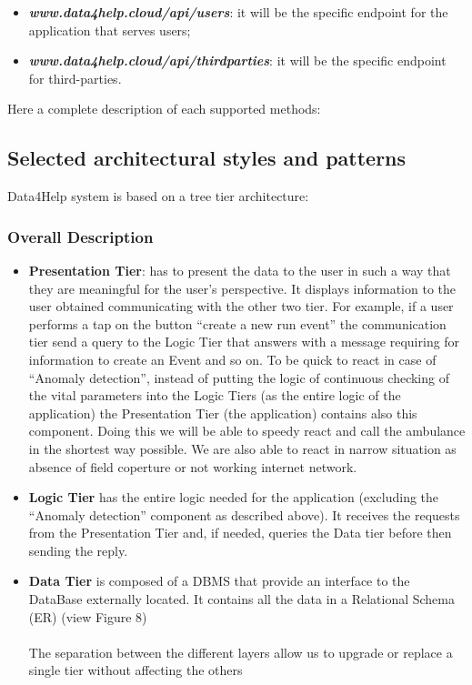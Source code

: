 \documentclass[DD.tex]{subfiles}
\begin{document}
\begin{itemize}
	\item \textit{\textbf{www.data4help.cloud/api/users}}: it will be the specific endpoint for the application that serves users;
	\item \textit{\textbf{www.data4help.cloud/api/thirdparties}}: it will be the specific endpoint for third-parties.
\end{itemize}

Here a complete description of each supported methods:

\newpage
\subsection{Selected architectural styles and patterns}
Data4Help system is based on a tree tier architecture:
\subsubsection{Overall Description}
\begin{itemize}
	\item \textbf{Presentation Tier}: has to present the data to the user in such a way that they are meaningful for the user’s perspective. It displays information to the user obtained communicating with the other two tier. For example, if a user performs a tap on the button “create a new run event” the communication tier send a query to the Logic Tier that answers with a message requiring for information to create an Event and so on.
		To be quick to react in case of “Anomaly detection”, instead of putting the logic of continuous checking of the vital parameters into the Logic Tiers (as the entire logic of the application) the Presentation Tier (the application) contains also this component. Doing this we will be able to speedy react and call the ambulance in the shortest way possible. We are also able to react in narrow situation as absence of field coperture or not working internet network.
	\item \textbf{Logic Tier} has the entire logic needed for the application (excluding the “Anomaly detection” component as described above). It receives the requests from the Presentation Tier and, if needed, queries the Data tier before then sending the reply.
	\item \textbf{Data Tier} is composed of a DBMS that provide an interface to the DataBase externally located. It contains all the data in a Relational Schema (ER) (view Figure 8)\\\\
	The separation between the different layers allow us to upgrade or replace a single tier without affecting the others
\end{itemize}
\end{document}
